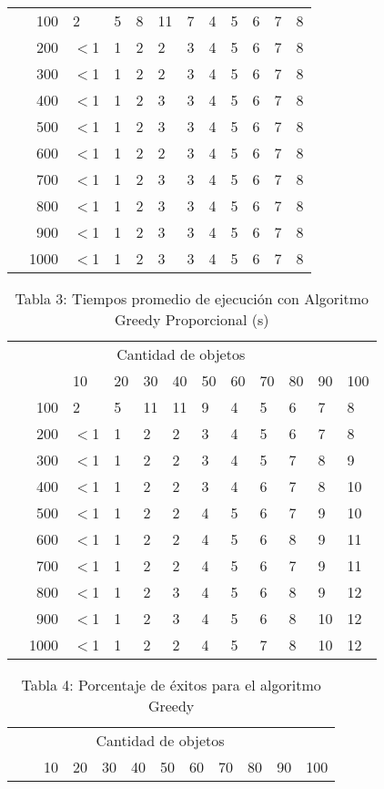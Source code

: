 \documentclass{article}
\begin{document}
\begin{center}
\begin{table}[ht]
\begin{tabularx}{0.8\textwidth}{Xr|XXXXXXXXXX}
\parbox[t]{2mm}{}&100&2&5&8&11&7&4&5&6&7&8\\
&200&$<$1&1&2&2&3&4&5&6&7&8\\
&300&$<$1&1&2&2&3&4&5&6&7&8\\
&400&$<$1&1&2&3&3&4&5&6&7&8\\
&500&$<$1&1&2&3&3&4&5&6&7&8\\
&600&$<$1&1&2&2&3&4&5&6&7&8\\
&700&$<$1&1&2&3&3&4&5&6&7&8\\
&800&$<$1&1&2&3&3&4&5&6&7&8\\
&900&$<$1&1&2&3&3&4&5&6&7&8\\
&1000&$<$1&1&2&3&3&4&5&6&7&8\\
\end{tabularx}
\end{table}
\begin{table}[ht]
\centering
\caption*{Tabla 3: Tiempos promedio de ejecución con Algoritmo Greedy Proporcional (\textmu s)}
\label{3}
\begin{tabularx}{0.8\textwidth}{Xr|XXXXXXXXXX}
&\multicolumn{10}{c}{Cantidad de objetos} \\
&&10&20&30&40&50&60&70&80&90&100\\\hline
\parbox[t]{2mm}{}&100&2&5&11&11&9&4&5&6&7&8\\
&200&$<$1&1&2&2&3&4&5&6&7&8\\
&300&$<$1&1&2&2&3&4&5&7&8&9\\
&400&$<$1&1&2&2&3&4&6&7&8&10\\
&500&$<$1&1&2&2&4&5&6&7&9&10\\
&600&$<$1&1&2&2&4&5&6&8&9&11\\
&700&$<$1&1&2&2&4&5&6&7&9&11\\
&800&$<$1&1&2&3&4&5&6&8&9&12\\
&900&$<$1&1&2&3&4&5&6&8&10&12\\
&1000&$<$1&1&2&2&4&5&7&8&10&12\\
\end{tabularx}
\end{table}
\begin{table}[ht]
\centering
\caption*{Tabla 4: Porcentaje de éxitos para el algoritmo Greedy}
\label{4}
\begin{tabularx}{0.8\textwidth}{Xr|XXXXXXXXXX}
&\multicolumn{10}{c}{Cantidad de objetos} \\
&&10&20&30&40&50&60&70&80&90&100\\\hline

\end{tabularx}
\end{table}
\end{center}
\end{document}
